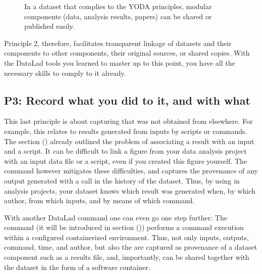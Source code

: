\begin{figure}[tbp]
\centering
\capstart

\noindent{}
\caption{In a dataset that complies to the YODA principles, modular components
(data, analysis results, papers) can be shared or published easily.}\label{\detokenize{basics/101-127-yoda:id7}}\end{figure}

\sphinxAtStartPar
Principle 2, therefore, facilitates transparent linkage of datasets and their
components to other components, their original sources, or shared copies.
With the DataLad tools you learned to master up to this point,
you have all the necessary skills to comply to it already.


\subsection{P3: Record what you did to it, and with what}
\label{\detokenize{basics/101-127-yoda:p3-record-what-you-did-to-it-and-with-what}}\label{\detokenize{basics/101-127-yoda:p3}}
\sphinxAtStartPar
This last principle is about capturing  that was not obtained from elsewhere. For example,
this relates to results generated from inputs by scripts or commands.
The section {\hyperref[\detokenize{basics/101-108-run:run}]{}} () already outlined the problem of associating
a result with an input and a script. It can be difficult to link a
figure from your data analysis project with an input data file or a
script, even if you created this figure yourself.
The  command however mitigates these difficulties,
and captures the provenance of any output generated with a
 call in the history of the dataset. Thus, by using
 in analysis projects, your dataset knows
which result was generated when, by which author, from which inputs,
and by means of which command.

\sphinxAtStartPar
With another DataLad command one can even go one step further:
The command  (it will be introduced in
section {\hyperref[\detokenize{basics/101-133-containersrun:containersrun}]{}} ()) performs a command execution within
a configured containerized environment. Thus, not only inputs,
outputs, command, time, and author, but also the 
are captured as provenance of a dataset component such as a results file,
and, importantly, can be shared together with the dataset in the
form of a software container.

